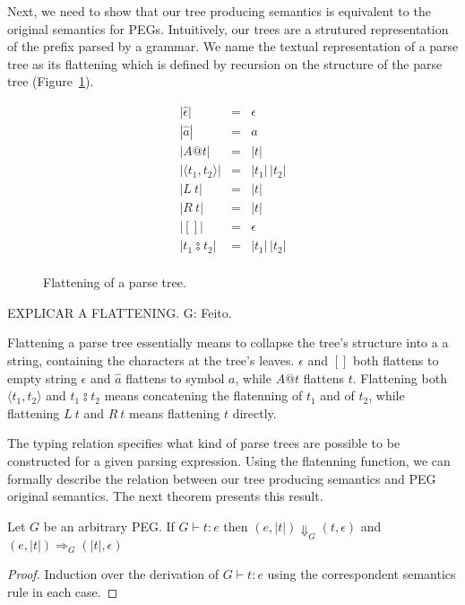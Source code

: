 Next, we need to show that our tree producing semantics is equivalent to
the original semantics for PEGs. Intuitively, our trees are a strutured
representation of the prefix parsed by a grammar. We name the textual
representation of a parse tree as its flattening which is defined
by recursion on the structure of the parse tree (Figure~\ref{fig:flattening-tree}).

\begin{figure}[H]
  \[
    \begin{array}{lcl}
      |\hat{\epsilon}| & = & \epsilon\\
      |\hat{a}| & = & a\\
      |A@t| & = & |t|\\
      |\langle t_1, t_2 \rangle| & = & |t_1|\,|t_2|\\
      |L\:t| & = & |t|\\
      |R\:t| & = & |t|\\
      |[]| & = & \epsilon \\
      |t_1  \typecolon  t_2| & = & |t_1|\,|t_2|\\
    \end{array}
  \]
  \centering
  \caption{Flattening of a parse tree.}
  \label{fig:flattening-tree}
\end{figure}

EXPLICAR A FLATTENING.
G: Feito.

Flattening a parse tree essentially means to collapse the tree's structure into a 
a string, containing the characters at the tree's leaves. \(\hat{\epsilon}\) and
\([]\) both flattens to empty string \(\epsilon\) and \(\hat{a}\) flattens to 
symbol \(a\), while \(A@t\) flattens \(t\). Flattening both \(\langle t_1, t_2 
\rangle\) and \(t_1  \typecolon  t_2\) means concatening the flatenning of \(t_1\) 
and of \(t_2\), while flattening \(L\:t\) and \(R\:t\) means flattening \(t\) directly. 

The typing relation specifies what kind of parse trees are possible to be
constructed for a given parsing expression. Using the flatenning function,
we can formally describe the relation between our tree producing semantics
and PEG original semantics.
The next theorem presents this result.

\begin{theorem}
  Let $G$ be an arbitrary PEG. If $G \vdash t : e$ then $(e, |t|) \Downarrow_G (t, \epsilon)$ and
  $(e, |t|)\Rightarrow_G (|t|, \epsilon)$
\end{theorem}
\begin{proof}
  Induction over the derivation of $G \vdash t : e$ using the correspondent semantics rule in each case.
\end{proof}

